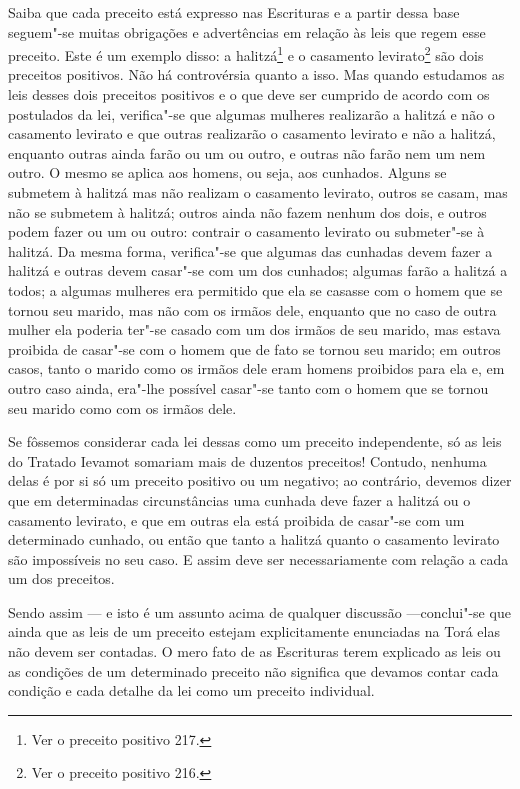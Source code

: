 \smallskip

Saiba que cada preceito está expresso nas Escrituras e a partir dessa
base seguem"-se muitas obrigações e advertências em relação às leis que
regem esse preceito. Este é um exemplo disso: a
halitzá\starr\footnote{Ver o preceito positivo 217.} e o casamento
levirato\starr\footnote{Ver o preceito positivo 216.} são dois preceitos positivos. Não há
controvérsia quanto a isso. Mas quando estudamos as leis desses dois
preceitos positivos e o que deve ser cumprido de acordo com os
postulados da lei, verifica"-se que algumas mulheres realizarão a
halitzá\starr{} e não o casamento levirato\starr{} e que outras realizarão o
casamento levirato\starr{} e não a halitzá\starr, enquanto outras ainda farão ou
um ou outro, e outras não farão nem um nem outro. O mesmo se aplica aos
homens, ou seja, aos cunhados. Alguns se submetem à halitzá\starr{} mas não
realizam o casamento levirato\starr, outros se casam, mas não se submetem à
halitzá\starr; outros ainda não fazem nenhum dos dois, e outros podem
fazer ou um ou outro: contrair o casamento levirato\starr{} ou submeter"-se à
halitzá\starr. Da mesma forma, verifica"-se que algumas das cunhadas devem
fazer a halitzá\starr{} e outras devem casar"-se com um dos cunhados; algumas
farão a halitzá\starr{} a todos; a algumas mulheres era permitido que ela se
casasse com o homem que se tornou seu marido, mas não com os irmãos
dele, enquanto que no caso de outra mulher ela poderia ter"-se casado com
um dos irmãos de seu marido, mas estava proibida de casar"-se com o homem
que de fato se tornou seu marido; em outros casos, tanto o marido como
os irmãos dele eram homens proibidos para ela e, em outro caso ainda,
era"-lhe possível casar"-se tanto com o homem que se tornou seu marido
como com os irmãos dele.

Se fôssemos considerar cada lei dessas como um preceito independente,
só as leis do Tratado Ievamot\starr{} somariam mais de duzentos preceitos!
Contudo, nenhuma delas é por si só um preceito positivo ou um negativo;
ao contrário, devemos dizer que em determinadas circunstâncias uma
cunhada deve fazer a halitzá\starr{} ou o casamento levirato\starr, e que em
outras ela está proibida de casar"-se com um determinado cunhado, ou
então que tanto a halitzá\starr{} quanto o casamento levirato\starr{} são
impossíveis no seu caso. E assim deve ser necessariamente com relação a
cada um dos preceitos.

Sendo assim --- e isto é um assunto acima de qualquer discussão
---conclui"-se que ainda que as leis de um preceito estejam
explicitamente enunciadas na Torá\starr{} elas não devem ser contadas. O mero
fato de as Escrituras terem explicado as leis ou as condições de um
determinado preceito não significa que devamos contar cada condição e
cada detalhe da lei como um preceito individual.

